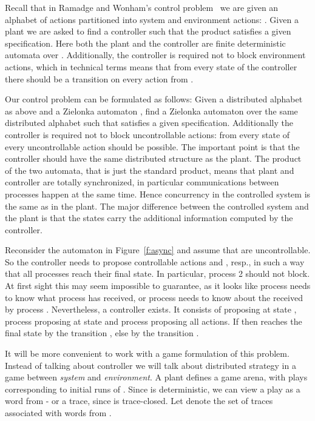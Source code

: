 \documentclass{llncs}
\begin{document}
Recall that in Ramadge and Wonham's control problem~\cite{RW89} we are
given an alphabet  of actions partitioned into system and
environment actions: . Given a plant  we
are asked to find a controller  such that the product 
satisfies a given specification. Here both the plant and the
controller are finite deterministic automata over . Additionally,
the controller is required not to block environment actions, which in
technical terms means that from every state of the controller there
should be a transition on every action from . 


Our control problem can be formulated as follows: Given a distributed
alphabet  as above and a Zielonka automaton ,
find a Zielonka automaton  over the same distributed alphabet such
that  satisfies a given specification. Additionally
the controller is required not to block uncontrollable actions: from
every state of  every uncontrollable action  should be possible.
 The important point is
that the controller should have the same distributed structure as the
plant. The product of the two automata, that is just the standard
product, means that plant and controller are totally synchronized, in
particular communications between processes happen at the same
 time. 
Hence concurrency in the controlled system is the same as in
the plant. The major difference between the controlled system and the
plant is that the states carry the additional information computed by
the controller.

\begin{example}
  Reconsider the automaton in Figure~\ref{f:async} and assume that
   are uncontrollable. So the controller needs to
  propose controllable actions  and , resp., in such a way that all
  processes reach their final state. In particular, process 2 should
  not block. At first sight this may seem impossible to guarantee, as it
  looks like process  needs to know what  process  has
  received, or process  needs to know about the  received by
  process . Nevertheless, a controller exists. It consists of
   proposing  at state , process  proposing
   at state  and process  proposing all
  actions. If  then  reaches the final state by the
  transition , else by the transition .
\end{example}



It will be more convenient to work with a game formulation of this
problem. Instead of talking about controller we will talk about
distributed strategy in a game between \emph{system} and
\emph{environment}. A plant defines a game arena, with plays
corresponding to initial runs of . Since  is deterministic,
we can view a play as a word from  - or a trace, since
 is trace-closed.  Let
 denote the set of traces associated with words from
.
\end{document}
